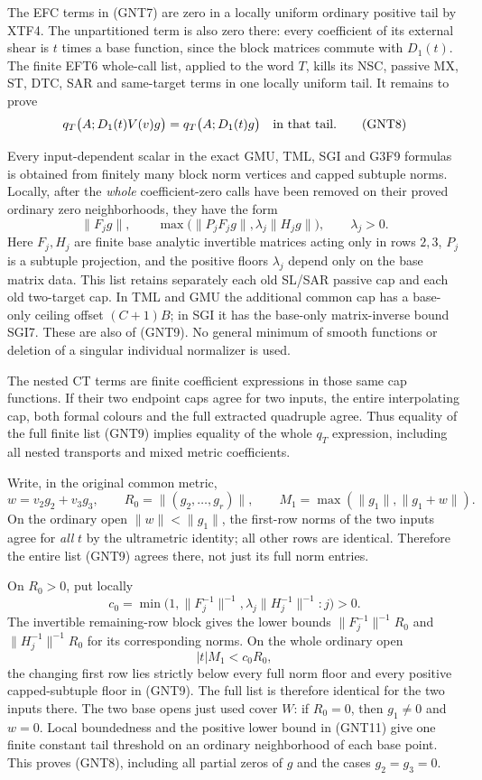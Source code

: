 The EFC terms in (GNT7) are zero in a locally uniform ordinary
positive tail by XTF4.  The unpartitioned term is also zero there:
every coefficient of its external shear is $t$ times a base
function, since the block matrices commute with $D_1(t)$.
The finite EFT6 whole-call list, applied to the word $T$, kills
its NSC, passive MX, ST, DTC, SAR and same-target terms in one
locally uniform tail.  It remains to prove
\[
 q_T\bigl(A;D_1(t)V(v)g\bigr)
                  =q_T\bigl(A;D_1(t)g\bigr)
                              \quad\hbox{in that tail}.
 \tag{GNT8}
\]

Every input-dependent scalar in the exact GMU, TML, SGI and
G3F9 formulas is obtained from finitely many block norm vertices
and capped subtuple norms.  Locally, after the \emph{whole}
coefficient-zero calls have been removed on their proved ordinary
zero neighborhoods, they have the form
\[
 \|F_jg\|,\qquad
 \max\bigl(\|P_jF_jg\|,\lambda_j\|H_jg\|\bigr),
                  \qquad \lambda_j>0.
 \tag{GNT9}
\]
Here $F_j,H_j$ are finite base analytic invertible matrices acting
only in rows $2,3$, $P_j$ is a subtuple projection, and the
positive floors $\lambda_j$ depend only on the base matrix data.
This list retains separately each old SL/SAR passive cap and
each old two-target cap.  In TML and GMU the additional common
cap has a base-only ceiling offset $(C+1)B$; in SGI it has the
base-only matrix-inverse bound SGI7.  These are also of (GNT9).
No general minimum of smooth functions or deletion of a singular
individual normalizer is used.

The nested CT terms are finite coefficient expressions in those
same cap functions.  If their two endpoint caps agree for two
inputs, the entire interpolating cap, both formal colours and
the full extracted quadruple agree.  Thus equality of the full
finite list (GNT9) implies equality of the whole $q_T$ expression,
including all nested transports and mixed metric coefficients.

Write, in the original common metric,
\[
 w=v_2g_2+v_3g_3,\qquad R_0=\|(g_2,\ldots,g_r)\|,
 \qquad M_1=\max(\|g_1\|,\|g_1+w\|).
 \tag{GNT10}
\]
On the ordinary open $\|w\|<\|g_1\|$, the first-row norms of
the two inputs agree for \emph{all} $t$ by the ultrametric identity;
all other rows are identical.  Therefore the entire list (GNT9)
agrees there, not just its full norm entries.

On $R_0>0$, put locally
\[
 c_0=\min\bigl(1,\|F_j^{-1}\|^{-1},
                         \lambda_j\|H_j^{-1}\|^{-1}:j\bigr)>0.
 \tag{GNT11}
\]
The invertible remaining-row block gives the lower bounds
$\|F_j^{-1}\|^{-1}R_0$ and $\|H_j^{-1}\|^{-1}R_0$ for its
corresponding norms.  On the whole ordinary open
\[
                         |t|M_1<c_0R_0,
 \tag{GNT12}
\]
the changing first row lies strictly below every full norm floor
and every positive capped-subtuple floor in (GNT9).  The full
list is therefore identical for the two inputs there.  The two
base opens just used cover $W$: if $R_0=0$, then $g_1\ne0$ and
$w=0$.  Local boundedness and the positive lower bound in
(GNT11) give one finite constant tail threshold on an ordinary
neighborhood of each base point.  This proves (GNT8), including
all partial zeros of $g$ and the cases $g_2=g_3=0$.

